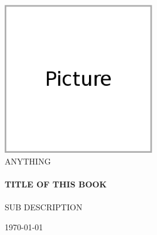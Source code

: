 \begin{titlepage}

\begin{center}

\includegraphics[width=0.5\textwidth]{img/picture}\\[1cm]    
\textsc{\LARGE ANYTHING}\\[1.5cm]

\HRule \\[0.4cm]
{ \huge \bfseries TITLE OF THIS BOOK}\\[0.4cm]
\HRule \\[1.5cm]
\textsc{\Large SUB DESCRIPTION}\\[0.5cm]

\vfill

\author{AUTHOR}
{\large \today}

\end{center}
\end{titlepage}